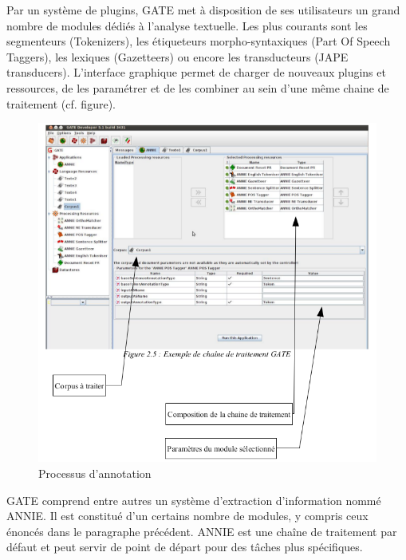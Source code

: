 \documentclass[a4paper, 11pt]{report}
\begin{document}
Par un système de plugins, GATE met à disposition de ses utilisateurs un grand nombre de
modules dédiés à l'analyse textuelle. Les plus courants sont les segmenteurs (Tokenizers), les
étiqueteurs morpho-syntaxiques (Part Of Speech Taggers), les lexiques (Gazetteers) ou encore les
transducteurs (JAPE transducers). L'interface graphique permet de charger de nouveaux plugins et
ressources, de les paramétrer et de les combiner au sein d'une même chaine de traitement (cf. figure).
\begin{figure}[H]
\begin{center}
\includegraphics[scale=0.3]{img/exempleChaineTraitement.png}
\end{center}
\caption{Processus d'annotation}
\end{figure}
GATE comprend entre autres un système d'extraction d'information nommé ANNIE. Il est constitué d'un certains nombre de modules, y compris ceux énoncés dans le paragraphe précédent. ANNIE est une chaîne de traitement par défaut et peut servir de point de départ pour des tâches plus spécifiques.
\end{document}
